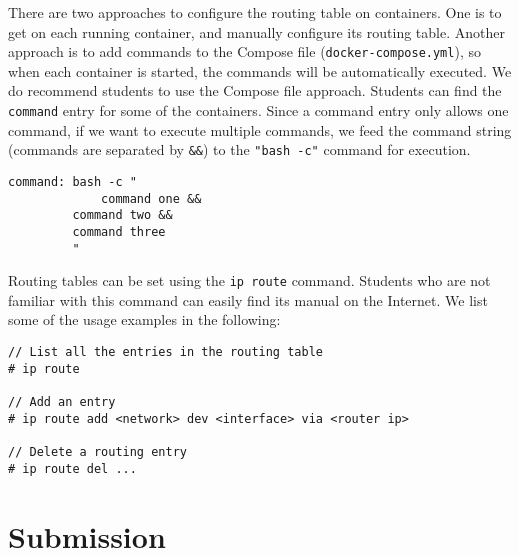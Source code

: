 There are two approaches to configure the routing table
on containers. One is to get on each running container, and manually configure its routing
table. Another approach is to add commands to the Compose file (\texttt{docker-compose.yml}), 
so when each container is started, the commands will be automatically
executed. We do recommend students to use the Compose file approach. 
Students can find the \texttt{command} entry for some of the 
containers. Since a command entry only allows one command,
if we want to execute multiple commands, we feed the command
string (commands are separated by \texttt{\&\&}) 
to the \texttt{"bash -c"} command for execution.

\begin{lstlisting}
command: bash -c "
             command one && 
	     command two && 
	     command three
         "
\end{lstlisting}
 

Routing tables can be set using the \texttt{ip route} command. Students who are not familiar 
with this command can easily find its manual on the Internet. We list 
some of the usage examples in the following:

\begin{lstlisting}
// List all the entries in the routing table 
# ip route 

// Add an entry 
# ip route add <network> dev <interface> via <router ip>

// Delete a routing entry
# ip route del ...
\end{lstlisting}



\section{Submission}

\seedsubmission





